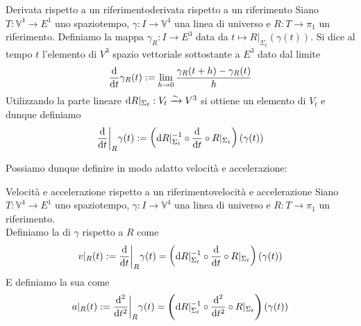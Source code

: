 \documentclass[openany]{book}
\renewcommand\V{\mathbb{V}}
\begin{document}
\begin{definition}{Derivata rispetto a un riferimento}{derivata rispetto a un riferimento}
    Siano $T:\V^4\to E^1$ uno spaziotempo, $\gamma : I\to\V^4$ una linea di universo e $R:T\to\pi_1$ un riferimento. Definiamo la mappa $\gamma_R : I \to E^3$ data da $t\mapsto R|_{\Sigma_t}(\gamma(t))$. Si dice  al tempo $t$ l'elemento di $V^3$ spazio vettoriale sottostante a $E^3$ dato dal limite 
    \[ \frac{\text{d}}{\text{d} t}\gamma_R(t) := \lim_{h \to 0}\frac{\gamma_R(t+h)-\gamma_R(t)}{h} \]
    Utilizzando la parte lineare $\text{d} R|_{\Sigma_t} : V_t\xrightarrow{\sim} V^3$ si ottiene un elemento di $V_t$ e dunque definiamo
    \[ \frac{\text{d}}{\text{d} t}\bigg|_R \gamma(t) := \left( \text{d} R|_{\Sigma_t}^{-1} \circ \frac{\text{d}}{\text{d} t} \circ R|_{\Sigma_t} \right)(\gamma(t)) \]
\end{definition}

Possiamo dunque definire in modo adatto velocità e accelerazione:

\begin{definition}{Velocità e accelerazione rispetto a un riferimento}{velocità e accelerazione}
    Siano $T:\V^4\to E^1$ uno spaziotempo, $\gamma : I\to\V^4$ una linea di universo e $R:T\to\pi_1$ un riferimento.\\
    Definiamo la  di $\gamma$ rispetto a $R$ come 
    \[ v|_R(t) := \frac{\text{d}}{\text{d} t}\bigg|_R \gamma(t) = \left( \text{d} R|_{\Sigma_t}^{-1} \circ \frac{\text{d}}{\text{d} t} \circ R|_{\Sigma_t} \right)(\gamma(t)) \]
    E definiamo la sua  come 
    \[ a|_R(t) := \frac{\text{d}^2}{\text{d} t^2}\bigg|_R \gamma(t) = \left( \text{d} R|_{\Sigma_t}^{-1} \circ \frac{\text{d}^2}{\text{d} t^2} \circ R|_{\Sigma_t} \right)(\gamma(t)) \]
\end{definition}
\end{document}
